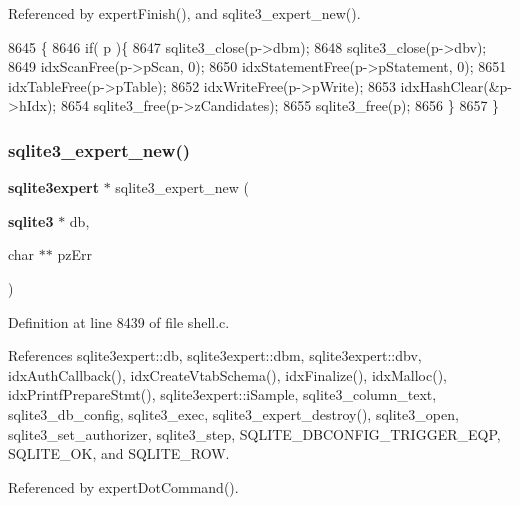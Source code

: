 Referenced by expert\+Finish(), and sqlite3\+\_\+expert\+\_\+new().


\begin{DoxyCode}
8645                                              \{
8646   \textcolor{keywordflow}{if}( p )\{
8647     sqlite3_close(p->dbm);
8648     sqlite3_close(p->dbv);
8649     idxScanFree(p->pScan, 0);
8650     idxStatementFree(p->pStatement, 0);
8651     idxTableFree(p->pTable);
8652     idxWriteFree(p->pWrite);
8653     idxHashClear(&p->hIdx);
8654     sqlite3_free(p->zCandidates);
8655     sqlite3_free(p);
8656   \}
8657 \}
\end{DoxyCode}
\mbox{\label{shell_8c_a4347c06d5e9138bac192582dd98ed7fd}} 
\subsubsection{sqlite3\+\_\+expert\+\_\+new()}
{\footnotesize\ttfamily \textbf{ sqlite3expert} $\ast$ sqlite3\+\_\+expert\+\_\+new (\begin{DoxyParamCaption}\item[{\textbf{ sqlite3} $\ast$}]{db,  }\item[{char $\ast$$\ast$}]{pz\+Err }\end{DoxyParamCaption})}



Definition at line 8439 of file shell.\+c.



References sqlite3expert\+::db, sqlite3expert\+::dbm, sqlite3expert\+::dbv, idx\+Auth\+Callback(), idx\+Create\+Vtab\+Schema(), idx\+Finalize(), idx\+Malloc(), idx\+Printf\+Prepare\+Stmt(), sqlite3expert\+::i\+Sample, sqlite3\+\_\+column\+\_\+text, sqlite3\+\_\+db\+\_\+config, sqlite3\+\_\+exec, sqlite3\+\_\+expert\+\_\+destroy(), sqlite3\+\_\+open, sqlite3\+\_\+set\+\_\+authorizer, sqlite3\+\_\+step, S\+Q\+L\+I\+T\+E\+\_\+\+D\+B\+C\+O\+N\+F\+I\+G\+\_\+\+T\+R\+I\+G\+G\+E\+R\+\_\+\+E\+QP, S\+Q\+L\+I\+T\+E\+\_\+\+OK, and S\+Q\+L\+I\+T\+E\+\_\+\+R\+OW.



Referenced by expert\+Dot\+Command().


